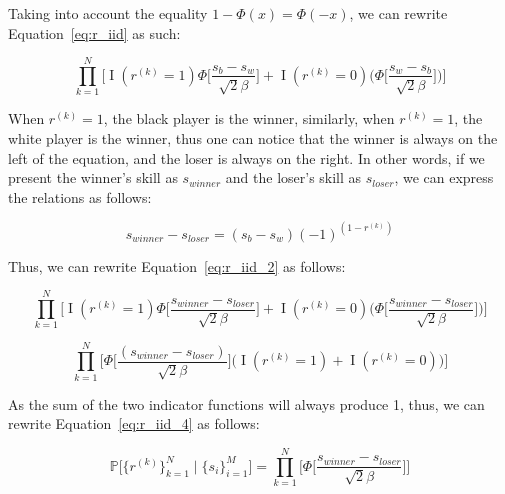 \documentclass[a4paper,11pt]{article}
\theoremstyle{mytheor}
\begin{document}
Taking into account the equality $1-\Phi(x)=\Phi(-x)$, we can rewrite Equation~\ref{eq:r_iid} as such:

\begin{equation}
    \label{eq:r_iid_2}
    \prod_{k=1}^{N}\Big[
    \mathop{I}(r^{(k)}=1)\Phi\Big[ \frac{s_b-s_w}{\sqrt{2}\beta} \Big] + 
    \mathop{I}(r^{(k)}=0)\Big(\Phi\Big[ \frac{s_w-s_b}{\sqrt{2}\beta} \Big] \Big)
    \Big]
\end{equation}

When $r^{(k)}=1$, the black player is the winner, similarly, when $r^{(k)}=1$, the white player is the winner, thus one can notice that the winner is always on the left of the equation, and the loser is always on the right. In other words, if we present the winner's skill as $s_{winner}$ and the loser's skill as $s_{loser}$, we can express the relations as follows:

\begin{equation}
    \label{eq:winner_loser}
    s_{winner}-s_{loser} = (s_b-s_w)(-1)^{(1-r^{(k)})}
\end{equation}

Thus, we can rewrite Equation~\ref{eq:r_iid_2} as follows:

\begin{equation}
    \label{eq:r_iid_3}
    \prod_{k=1}^{N}\Big[
    \mathop{I}(r^{(k)}=1)\Phi\Big[ \frac{s_{winner}-s_{loser}}{\sqrt{2}\beta} \Big] + 
    \mathop{I}(r^{(k)}=0)\Big(\Phi\Big[ \frac{s_{winner}-s_{loser}}{\sqrt{2}\beta} \Big] \Big)
    \Big]
\end{equation}

\begin{equation}
    \label{eq:r_iid_4}
    \prod_{k=1}^{N}\Big[
        \Phi\Big[ \frac{(s_{winner}-s_{loser})}{\sqrt{2}\beta} \Big]
        \Big(\mathop{I}(r^{(k)}=1) + \mathop{I}(r^{(k)}=0)\Big)
    \Big]
\end{equation}

As the sum of the two indicator functions will always produce 1, thus, we can rewrite Equation~\ref{eq:r_iid_4} as follows:

\begin{equation}
    \label{eq:r_iid_5}
    \mathbb{P} \Big[ \{r^{(k)}\}_{k=1}^{N}  \mid \{s_i\}_{i=1}^{M} \Big] = 
    \prod_{k=1}^{N}\Big[
        \Phi\Big[ \frac{s_{winner}-s_{loser}}{\sqrt{2}\beta} \Big]
    \Big]
\end{equation}
\end{document}
